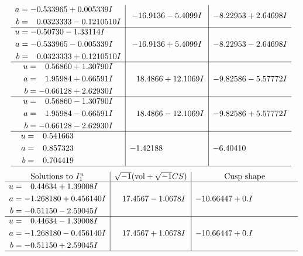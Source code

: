\documentclass[1p]{elsarticle_modified}
\theoremstyle{definition}
\newcommand{\I}{\sqrt{-1}}
\begin{document}
$$\begin{array}{c|c|c}
\begin{aligned}
a &= -0.533965 + 0.005339 I \\
b &= \phantom{-}0.0323333 - 0.1210510 I\end{aligned}
 & -16.9136 - 5.4099 I & -8.22953 + 2.64698 I \\ \hline\begin{aligned}
u &= -0.50730 - 1.33114 I \\
a &= -0.533965 - 0.005339 I \\
b &= \phantom{-}0.0323333 + 0.1210510 I\end{aligned}
 & -16.9136 + 5.4099 I & -8.22953 - 2.64698 I \\ \hline\begin{aligned}
u &= \phantom{-}0.56860 + 1.30790 I \\
a &= \phantom{-}1.95984 + 0.66591 I \\
b &= -0.66128 + 2.62930 I\end{aligned}
 & \phantom{-}18.4866 + 12.1069 I & -9.82586 - 5.57772 I \\ \hline\begin{aligned}
u &= \phantom{-}0.56860 - 1.30790 I \\
a &= \phantom{-}1.95984 - 0.66591 I \\
b &= -0.66128 - 2.62930 I\end{aligned}
 & \phantom{-}18.4866 - 12.1069 I & -9.82586 + 5.57772 I \\ \hline\begin{aligned}
u &= \phantom{-}0.541663\phantom{ +0.000000I} \\
a &= \phantom{-}0.857323\phantom{ +0.000000I} \\
b &= \phantom{-}0.704419\phantom{ +0.000000I}\end{aligned}
 & -1.42188\phantom{ +0.000000I} & -6.40410\phantom{ +0.000000I}\\
 \hline 
 \end{array}$$\newpage$$\begin{array}{c|c|c}  
\text{Solutions to }I^u_{1}& \I (\text{vol} + \sqrt{-1}CS) & \text{Cusp shape}\\
 \hline 
\begin{aligned}
u &= \phantom{-}0.44634 + 1.39008 I \\
a &= -1.268180 + 0.456140 I \\
b &= -0.51150 - 2.59045 I\end{aligned}
 & \phantom{-}17.4567 - 1.0678 I & -10.66447 + 0. I\phantom{ +0.000000I} \\ \hline\begin{aligned}
u &= \phantom{-}0.44634 - 1.39008 I \\
a &= -1.268180 - 0.456140 I \\
b &= -0.51150 + 2.59045 I\end{aligned}
 & \phantom{-}17.4567 + 1.0678 I & -10.66447 + 0. I\phantom{ +0.000000I}\\
 \hline 
 \end{array}$$\newpage\newpage\renewcommand{\arraystretch}{1}
\end{document}
